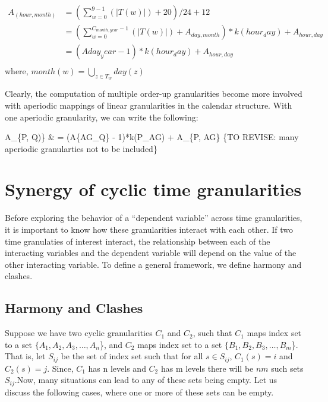 \documentclass[12pt]{article}
\begin{document}
\begin{equation} \label{eq11}
\begin{split}
A_{(hour, month)} & = (\sum_{w=0}^{9 - 1}(\vert T(w)\vert) +  20)/24 + 12 \\
                  & = (\sum_{w=0}^{C_{month, year} - 1}(\vert T(w)\vert) +  A_{day, month})*k(hour_day) + A_{hour, day} \\
                  & = (A{day_year} - 1)*k(hour_day) + A_{hour, day} \\
\end{split}
\end{equation} where, \(month(w) = \bigcup_{z \in T_w}day(z)\)

Clearly, the computation of multiple order-up granularities become more
involved with aperiodic mappings of linear granularities in the calendar
structure. With one aperiodic granularity, we can write the following:

A\_\{P, Q)\} \& = (A\{AG\_Q\} - 1)*k(P\_AG) + A\_\{P, AG\} \{TO REVISE:
many aperiodic granularties not to be included\}

\hypertarget{sec:synergy}{%
\section{Synergy of cyclic time granularities}\label{sec:synergy}}

Before exploring the behavior of a ``dependent variable'' across time
granularities, it is important to know how these granularities interact
with each other. If two time granulaties of interest interact, the
relationship between each of the interacting variables and the dependent
variable will depend on the value of the other interacting variable. To
define a general framework, we define harmony and clashes.

\hypertarget{harmony-and-clashes}{%
\subsection{Harmony and Clashes}\label{harmony-and-clashes}}

Suppose we have two cyclic granularities \(C_1\) and \(C_2\), such that
\(C_1\) maps index set to a set \(\{A_1,A_2,A_3,\dots, A_n\)\}, and
\(C_2\) maps index set to a set \(\{B_1,B_2,B_3,\dots, B_m\)\}. That is,
let \(S_{ij}\) be the set of index set such that for all
\(s \in S_{ij}\), \(C_1(s) = i\) and \(C_2(s) = j\). Since, \(C_1\) has
n levels and \(C_2\) has m levels there will be \(nm\) such sets
\(S_{ij}\).Now, many situations can lead to any of these sets being
empty. Let us discuss the following cases, where one or more of these
sets can be empty.
\end{document}
